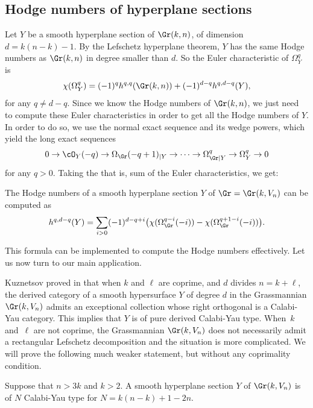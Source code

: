 \subsection{Hodge numbers of hyperplane sections}\label{HG}
Let $Y$ be a smooth hyperplane section of $\Gr(k,n)$, of dimension $d=k(n-k)-1$.
By the Lefschetz hyperplane
theorem, $Y$ has the same Hodge numbers as $\Gr(k,n)$ in degree smaller than $d$. So
the Euler characteristic of $\Omega^q_{Y}$ is
\[
\chi(\Omega^q_{Y})=(-1)^qh^{q,q}(\Gr(k,n))+(-1)^{d-q}h^{q,d-q}(Y),
\]
for any $q\ne d-q$. Since we know the Hodge numbers of $\Gr(k,n)$, we just need to compute these
Euler characteristics in order to get all the Hodge numbers of $Y$. In order to
do so, we use the normal exact sequence and
its wedge powers, which yield the long exact sequences
\[
0\to\cO_Y(-q)\to \Omega_{\Gr}(-q+1)_{|Y}\to\cdots\to \Omega^q_{\Gr |Y}\to\Omega^q_{Y}\to 0
\]
for any $q>0$. Taking the that is,  sum of the Euler characteristics, we get:

\begin{prop}\label{hodgenumbers}
The Hodge numbers of a smooth hyperplane section $Y$ of $\Gr=\Gr(k,V_n)$ can be
computed as
\begin{equation*}
h^{q,d-q}(Y) = \sum_{i>0}(-1)^{d-q+i}\bigl(
\chi (\Omega_{\Gr}^{q-i}(-i))-\chi(\Omega_{\Gr}^{q+1-i}(-i))\bigr).
\end{equation*}
\end{prop}

This formula can be implemented to compute the Hodge numbers effectively.
Let us now turn to our main application.

Kuznetsov proved in \cite[Cor.\,4.4]{kuz-fractional} that when $k$ and $\ell$ are
coprime, and $d$ divides $n=k+\ell$, the derived category of a smooth hypersurface $Y$
of degree $d$ in the Grassmannian $\Gr(k,V_n)$ admits an exceptional collection whose
right orthogonal is a Calabi-Yau category. This implies that $Y$ is of pure derived Calabi-Yau type. When~$k$ and~$\ell$ are not coprime,
the Grassmannian $\Gr(k,V_n)$ does not necessarily admit a rectangular Lefschetz decomposition
and the situation is more complicated. We will prove the following much weaker statement,
but without any coprimality condition.

\begin{theorem}\label{thm:sect-of-G}
Suppose that $n>3k$ and $k>2$. A smooth hyperplane section $Y$ of $\Gr(k,V_n)$ is of $N$ Calabi-Yau type for $N=k(n-k)+1-2n$.
\end{theorem}

